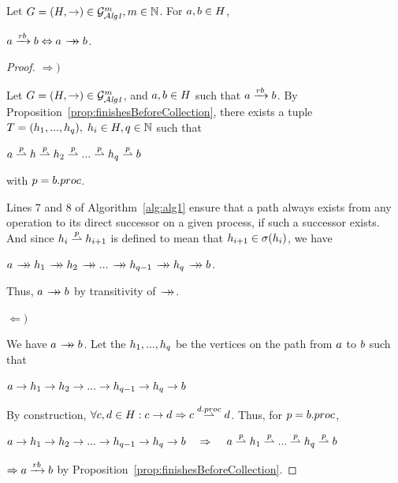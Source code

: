 \documentclass[12pt]{article}
\begin{document}
\begin{proposition}\label{prop:looparrowPATH}
Let $G=(H,\rightarrow)\in\mathcal{G}_{\mathcal{A}\emph{lg1}}^m,m\in\mathbb{N}$. For \mbox{$a,b \in H$},
\begin{center}
$\opa\rb\opb \Leftrightarrow \opa\patharrow\opb$.
\end{center}
\end{proposition}
\begin{proof}
$\Rightarrow)$

Let $G=(H,\rightarrow)\in\mathcal{G}_{\mathcal{A}\emph{lg1}}^m$, and $a,b \in H$ such that $a\xrightarrow{rb}b$. By Proposition~\ref{prop:finishesBeforeCollection}, there exists a tuple \mbox{$T=(h_1,...,h_q),\; h_i \in H, q\in\mathbb{N}$} such that 
\begin{center}
\mbox{$a\stackrel{p}{\rightharpoonup} h \stackrel{p}{\rightharpoonup} h_2 \stackrel{p}{\rightharpoonup} ... \stackrel{p}{\rightharpoonup} h_q \stackrel{p}{\rightharpoonup} b$}

\end{center}
with  $p=b.proc$. 

Lines 7 and 8 of Algorithm~\ref{alg:alg1} ensure that a path always exists from any operation to its direct successor on a given process, if such a successor exists. And since $h_i \stackrel{p}{\rightharpoonup} h_{i+1}$  is defined to mean that  $h_{i+1}\in\sigma(h_i)$, we have

\begin{center}
$\opa \patharrow \oph_1 \patharrow \oph_2 \patharrow ... \patharrow \oph_{q-1} \patharrow \oph_q \patharrow \opb$.
\end{center}

Thus, $\opa\patharrow\opb$ by transitivity of $\patharrow$.


$\Leftarrow)$

We have $\opa\patharrow\opb$. Let the $h_1,...,h_q$ be the vertices on the path from $a$ to $b$ such that

\begin{center}
$
a \rightarrow h_1 \rightarrow h_2 \rightarrow ... \rightarrow h_{q-1} \rightarrow h_q \rightarrow b
$
\end{center}


By construction, $\forall c,d\in H:c\rightarrow d\Rightarrow c\stackrel{d.proc}{\rightharpoonup}d$. Thus, for $p=b.proc$,

\begin{center}
$
a \rightarrow h_1 \rightarrow h_2 \rightarrow ... \rightarrow h_{q-1} \rightarrow h_q \rightarrow b
 \quad\Rightarrow\quad$
\mbox{$a \stackrel{p}{\rightharpoonup} h_1 \stackrel{p}{\rightharpoonup} ... \stackrel{p}{\rightharpoonup} h_q \stackrel{p}{\rightharpoonup} b$} 
\end{center}

$\Rightarrow a \xrightarrow{rb} b$ by Proposition~\ref{prop:finishesBeforeCollection}.
\end{proof}
\end{document}
